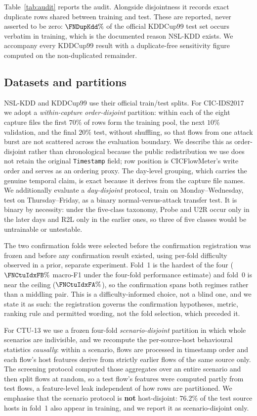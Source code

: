 Table~\ref{tab:audit} reports the audit. Alongside disjointness it records exact
duplicate rows shared between training and test. These are reported, never
asserted to be zero: $\FNDupKdd\%$ of the official KDDCup99 test set occurs verbatim
in training, which is the documented reason NSL-KDD exists. We accompany every
KDDCup99 result with a duplicate-free sensitivity figure computed on the
non-duplicated remainder.

\subsection{Datasets and partitions}

NSL-KDD and KDDCup99 use their official train/test splits. For CIC-IDS2017 we
adopt a \emph{within-capture order-disjoint} partition: within each of the eight
capture files the first $70\%$ of rows form the training pool, the next $10\%$
validation, and the final $20\%$ test, without shuffling, so that flows from one
attack burst are not scattered across the evaluation boundary. We describe this
as order-disjoint rather than chronological because the public redistribution we
use does not retain the original \texttt{Timestamp} field; row position is
CICFlowMeter's write order and serves as an ordering proxy. The day-level
grouping, which carries the genuine temporal claim, is exact because it derives
from the capture file names. We additionally evaluate a \emph{day-disjoint}
protocol, train on Monday--Wednesday, test on Thursday--Friday, as a
binary normal-versus-attack transfer test. It is binary by necessity: under the
five-class taxonomy, Probe and U2R occur only in the later days and R2L only in
the earlier ones, so three of five classes would be untrainable or untestable.

The two confirmation folds were selected before the confirmation registration
was frozen and before any confirmation result existed, using per-fold difficulty
observed in a prior, separate experiment. Fold~1 is the hardest of the four
($\FNCtuIdxFB\%$ macro-F1 under the four-fold performance estimate) and fold~0
is near the ceiling ($\FNCtuIdxFA\%$), so the confirmation spans both regimes
rather than a middling pair. This is a difficulty-informed choice, not a blind
one, and we state it as such: the registration governs the confirmation
hypotheses, metric, ranking rule and permitted wording, not the fold selection,
which preceded it.

For CTU-13 we use a frozen four-fold \emph{scenario-disjoint} partition in which
whole scenarios are indivisible, and we recompute the per-source-host behavioural
statistics \emph{causally}: within a scenario, flows are processed in timestamp
order and each flow's host features derive from strictly earlier flows of the
same source only. The screening protocol computed those aggregates over an entire
scenario and then split flows at random, so a test flow's features were computed
partly from test flows, a feature-level leak independent of how rows are
partitioned. We emphasise that the scenario protocol is \textbf{not}
host-disjoint: $76.2\%$ of the test source hosts in fold~1 also appear in
training, and we report it as scenario-disjoint only.

